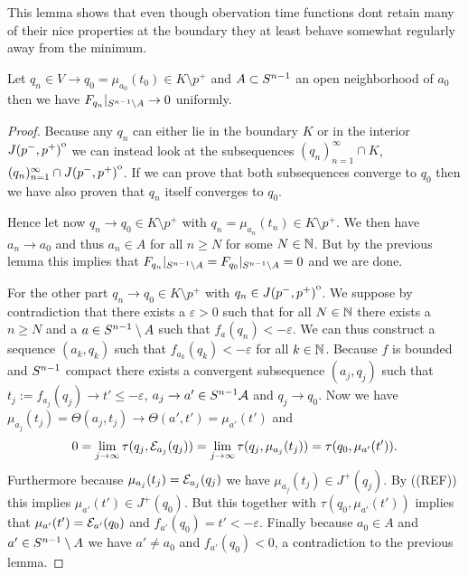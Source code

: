 This lemma shows that even though obervation time functions dont retain many of their nice properties at the boundary they at least behave somewhat regularly away from the minimum.
\begin{lemma}\label{lem:convto1}
    Let $q_n\in V\to q_0=\mu_{a_0}(t_0)\in K\setminus{p^+}$ and $A\subset {S^{n-1}}$ an open neighborhood of $a_0$ then we have $F_{q_n}\rvert_{{S^{n-1}}\setminus A} \to 0$ uniformly.
\end{lemma}
\begin{proof}
    Because any $q_n$ can either lie in the boundary $K$ or in the interior ${\kern0ptJ(p^-,p^+)}^{\mathrm{o}}$ we can instead look at the subsequences $(q_n)_{n=1}^\infty \cap K$, $(q_n)_{n=1}^\infty \cap {\kern0ptJ(p^-,p^+)}^{\mathrm{o}}$. If we can prove that both subsequences converge to $q_0$ then we have also proven that $q_n$ itself converges to $q_0$. 

    Hence let now $q_n \to q_0\in K\setminus p^+$ with $q_n=\mu_{a_n}(t_n) \in K\setminus p^+$. We then have $a_n\to a_0$ and thus $a_n \in A$ for all $n\ge N$ for some $N\in \mathbb{N}$. But by the previous lemma this implies that $F_{q_n}\rvert_{{S^{n-1}}\setminus A} = F_{q_0}\rvert_{{S^{n-1}}\setminus A} = 0$ and we are done.

    For the other part $q_n \to q_0\in K\setminus p^+$ with $q_n \in {\kern0ptJ(p^-,p^+)}^{\mathrm{o}}$.
    We suppose by contradiction that there exists a $\varepsilon>0$ such that for all $N\in \mathbb{N}$ there exists a $n\ge N$ and a $a\in {S^{n-1}}\setminus A$ such that $f_a(q_n)<-\varepsilon$. We can thus construct a sequence $(a_k, q_k)$ such that $f_{a_k}(q_k)<-\varepsilon$ for all $k\in \mathbb{N}$. Because $f$ is bounded and ${S^{n-1}}$ compact there exists a convergent subsequence $(a_j,q_j)$ such that $t_j:=f_{a_j}(q_j)\to t'\leq -\varepsilon$, $a_j \to a'\in {S^{n-1}}\mathcal{A}$ and $q_j\to q_0$. Now we have $\mu_{a_j}(t_j) = \Theta(a_j,t_j) \to \Theta(a',t')=\mu_{a'}(t')$ and 
    \[
        0 = \lim_{j\to \infty}\tau(q_j,{\mathcal{E}}_{a_j}(q_j)) = \lim_{j\to \infty}\tau(q_j,\mu_{a_j}(t_j)) = \tau(q_0,\mu_{a'}(t')).
    \]
    Furthermore because $\mu_{a_j}(t_j)={\mathcal{E}}_{a_j}(q_j)$ we have $\mu_{a_j}(t_j)\in J^+(q_j)$. By ((REF)) this implies $\mu_{a'}(t')\in J^+(q_0)$. But this together with $\tau(q_0,\mu_{a'}(t'))$ implies that $\mu_{a'}(t')={\mathcal{E}}_{a'}(q_0)$ and $f_{a'}(q_0)=t'<-\varepsilon$. Finally because $a_0\in A$ and $a'\in {S^{n-1}}\setminus A$ we have $a'\neq a_0$ and $f_{a'}(q_0) <  0$, a contradiction to the previous lemma.
\end{proof}

